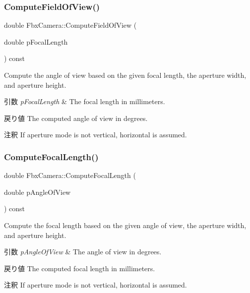 \subsubsection{\texorpdfstring{Compute\+Field\+Of\+View()}{ComputeFieldOfView()}}
{\footnotesize\ttfamily double Fbx\+Camera\+::\+Compute\+Field\+Of\+View (\begin{DoxyParamCaption}\item[{double}]{p\+Focal\+Length }\end{DoxyParamCaption}) const}

Compute the angle of view based on the given focal length, the aperture width, and aperture height. 
\begin{DoxyParams}{引数}
{\em p\+Focal\+Length} & The focal length in millimeters. \\
\hline
\end{DoxyParams}
\begin{DoxyReturn}{戻り値}
The computed angle of view in degrees. 
\end{DoxyReturn}
\begin{DoxyRemark}{注釈}
If aperture mode is not vertical, horizontal is assumed. 
\end{DoxyRemark}
\mbox{\label{class_fbx_camera_aeb7c4720e64f1c247a0089943f521dc6}} 
\subsubsection{\texorpdfstring{Compute\+Focal\+Length()}{ComputeFocalLength()}}
{\footnotesize\ttfamily double Fbx\+Camera\+::\+Compute\+Focal\+Length (\begin{DoxyParamCaption}\item[{double}]{p\+Angle\+Of\+View }\end{DoxyParamCaption}) const}

Compute the focal length based on the given angle of view, the aperture width, and aperture height. 
\begin{DoxyParams}{引数}
{\em p\+Angle\+Of\+View} & The angle of view in degrees. \\
\hline
\end{DoxyParams}
\begin{DoxyReturn}{戻り値}
The computed focal length in millimeters. 
\end{DoxyReturn}
\begin{DoxyRemark}{注釈}
If aperture mode is not vertical, horizontal is assumed. 
\end{DoxyRemark}
\mbox{\label{class_fbx_camera_a1d591f5fa59e93139cc1901b3ab92d21}} 
